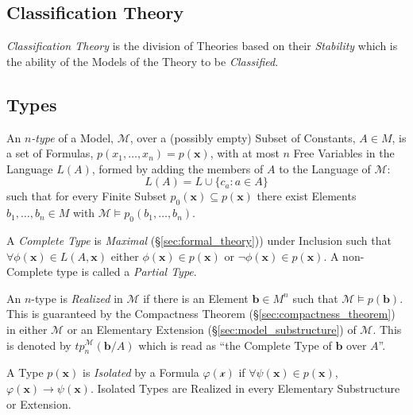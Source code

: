 \subsection{Classification Theory}

\emph{Classification Theory} is the division of Theories based on
their \emph{Stability} which is the ability of the Models of the
Theory to be \emph{Classified}.



\subsection{Types}

An \emph{$n$-type} of a Model, $\mathcal{M}$, over a (possibly empty)
Subset of Constants, $A \in M$, is a set of Formulas,
$p(x_1,\ldots,x_n) = p(\mathbf{x})$, with at most $n$ Free Variables
in the Language $L(A)$, formed by adding the members of $A$ to the
Language of $\mathcal{M}$:
\[
    L(A) = L \cup \{ c_a : a \in A \}
\]
such that for every Finite Subset $p_0(\mathbf{x}) \subseteq
p(\mathbf{x})$ there exist Elements $b_1,\ldots,b_n \in M$ with
$\mathcal{M} \vDash p_0(b_1,\ldots,b_n)$.

A \emph{Complete Type} is \emph{Maximal}
(\S\ref{sec:formal_theory})) under Inclusion such that $\forall
\phi(\mathbf{x}) \in L(A,\mathbf{x})$ either $\phi(\mathbf{x}) \in
p(\mathbf{x})$ or $\neg \phi(\mathbf{x}) \in p(\mathbf{x})$. A
non-Complete type is called a \emph{Partial Type}.

An $n$-type is \emph{Realized} in $\mathcal{M}$ if there is an Element
$\mathbf{b} \in M^n$ such that $\mathcal{M} \vDash
p(\mathbf{b})$. This is guaranteed by the Compactness Theorem
(\S\ref{sec:compactness_theorem}) in either $\mathcal{M}$ or an
Elementary Extension (\S\ref{sec:model_substructure}) of
$\mathcal{M}$. This is denoted by $tp_{n}^{\mathcal{M}}(\mathbf{b}/A)$
which is read as ``the Complete Type of $\mathbf{b}$ over $A$''.

A Type $p(\mathbf{x})$ is \emph{Isolated} by a Formula
$\varphi(\mathcal{x})$ if $\forall \psi(\mathbf{x}) \in
p(\mathbf{x})$, $\varphi (\mathbf{x}) \rightarrow
\psi(\mathbf{x})$. Isolated Types are Realized in every Elementary
Substructure or Extension.



